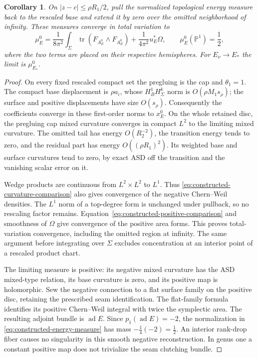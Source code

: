 \documentclass[11pt]{amsart}
\newtheorem{corollary}[theorem]{Corollary}
\theoremstyle{definition}
\theoremstyle{remark}
\theoremstyle{plain}
\newcommand{\PP}{\mathbb{P}}
\newcommand{\ad}{\operatorname{ad}}
\newcommand{\tr}{\operatorname{tr}}
\begin{document}
\begin{corollary}\label{cor:constructed-energy-measure}
On $|z-c|\leq\rho R_1/2$, pull the normalized topological energy
measure back to the rescaled base and extend it by zero over the omitted
neighborhood of infinity. These measures converge in total variation to
\begin{equation}\label{eq:constructed-energy-measure}
 \mu_E^0=\frac1{8\pi^2}\int_\Sigma
                 \tr(F_{A_E^0}\wedge F_{A_E^0})
                     +\frac1{4\pi^2}u_E^*\Omega,
              \qquad \mu_E^0(\PP^1)=\frac12,
\end{equation}
where the two terms are placed on their respective hemispheres. For
$E_\nu\to E_*$ the limit is $\mu_{E_*}^0$.
\end{corollary}

\begin{proof}
On every fixed rescaled compact set the pregluing is the cap and
$\theta_1=1$. The compact base displacement is $\rho a_i$, whose
$H^1_BH^k_\Sigma$ norm is $O(\rho M_1s_\rho)$; the surface and
positive displacements have size $O(s_\rho)$. Consequently the
coefficients converge in these first-order norms to $x_E^0$.
On the whole retained disc, the pregluing cap mixed curvature converges
in compact $L^2$ to the limiting mixed curvature. The omitted tail has
energy $O(R_2^{-2})$, the transition energy tends to zero, and the
residual part has energy $O((\rho R_1)^2)$. Its weighted base and
surface curvatures tend to zero, by exact ASD off the transition and
the vanishing scalar error on it.

Wedge products are continuous from $L^2\times L^2$ to $L^1$.
Thus \eqref{eq:constructed-curvature-comparison} also gives convergence
of the negative Chern--Weil densities. The $L^1$ norm of a top-degree
form is unchanged under pullback, so no rescaling factor remains.
Equation~\eqref{eq:constructed-positive-comparison} and smoothness of
$\Omega$ give convergence of the positive area forms. This proves
total-variation convergence, including the omitted region at infinity.
The same argument before integrating over $\Sigma$ excludes
concentration at an interior point of a rescaled product chart.

The limiting measure is positive: its negative mixed curvature has the
ASD mixed-type relation, its base curvature is zero, and its positive
map is holomorphic. Sew the negative connection to a flat surface family
on the positive disc, retaining the prescribed seam identification.
The flat-family formula \cite[Lemma~5.10 and equation~(5.12)]{DaeFukLip21a}
identifies its positive Chern--Weil integral with
twice the symplectic area. The resulting adjoint bundle is $\ad E$.
Since $p_1(\ad E)=-2$, the normalization in
\eqref{eq:constructed-energy-measure} has mass
$-\frac14(-2)=\frac12$. An interior rank-drop fiber causes no
singularity in this smooth negative reconstruction. In genus one a
constant positive map does not trivialize the seam clutching bundle.
\end{proof}
\end{document}
